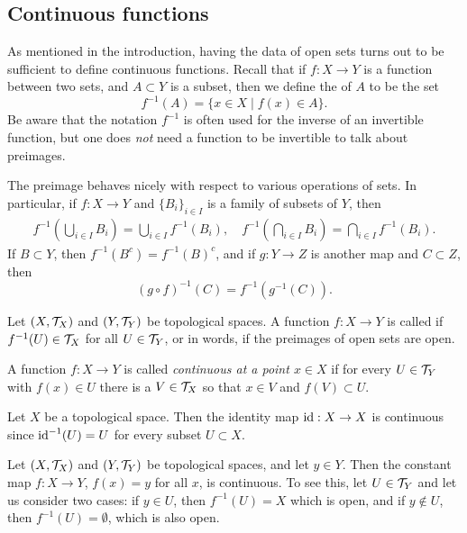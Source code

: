 \subsection{Continuous functions}
As mentioned in the introduction, having the data of open sets turns out to be sufficient to define continuous functions. Recall that if $f : X \to Y$ is a function between two sets, and $A \subset Y$ is a subset, then we define the  of $A$ to be the set
\[
  f^{-1}(A) = \{ x \in X \mid f(x) \in A \}.
\]
Be aware that the notation $f^{-1}$ is often used for the inverse of an invertible function, but one does \emph{not} need a function to be invertible to talk about preimages.

\begin{prop}
  \label{preimage-props}
  The preimage behaves nicely with respect to various operations of sets. In particular, if $f : X \to Y$ and $\{B_i\}_{i \in I}$ is a family of subsets of $Y$, then
  \begin{align*}
    f^{-1}\left( \bigcup_{i \in I} B_i \right) = \bigcup_{i \in I} f^{-1}(B_i), \quad f^{-1}\left( \bigcap_{i \in I} B_i \right) = \bigcap_{i \in I} f^{-1}(B_i).
  \end{align*}
  If $B \subset Y$, then $f^{-1}(B^c) = f^{-1}(B)^c$, and if $g : Y \to Z$ is another map and $C \subset Z$, then
  \[
    (g \circ f)^{-1}(C) = f^{-1}(g^{-1}(C)).
  \]
\end{prop}
\begin{defn}
  \label{continuity-def}
  Let $(X,\mathcal{T}_X)$ and $(Y,\mathcal{T}_Y)$ be topological spaces. A function $f : X \to Y$ is called  if $f^{-1}(U) \in \mathcal{T}_X$ for all $U \in \mathcal{T}_Y$, or in words, if the preimages of open sets are open.
  
  A function $f : X \to Y$ is called \emph{continuous at a point $x \in X$} if for every $U \in \mathcal{T}_Y$ with $f(x) \in U$ there is a $V \in \mathcal{T}_X$ so that $x \in V$ and $f(V) \subset U$.
\end{defn}
\begin{example}
  Let $X$ be a topological space. Then the identity map $\mathrm{id} : X \to X$ is continuous since $\mathrm{id}^{-1}(U) = U$ for every subset $U \subset X$.
\end{example}
\begin{example}
  Let $(X,\mathcal{T}_X)$ and $(Y,\mathcal{T}_Y)$ be topological spaces, and let $y \in Y$. Then the constant map $f : X \to Y$, $f(x) = y$ for all $x$, is continuous. To see this, let $U \in \mathcal{T}_Y$ and let us consider two cases: if $y \in U$, then $f^{-1}(U) = X$ which is open, and if $y \notin U$, then $f^{-1}(U) = \emptyset$, which is also open.
\end{example}
